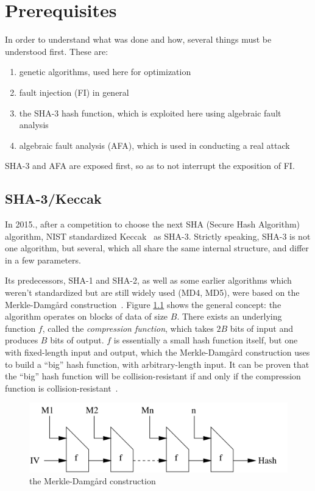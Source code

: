 \documentclass[times, utf8, diplomski]{fer}
\begin{document}
\chapter{Prerequisites}\label{ch:prerequisites}
In order to understand what was done and how, several things must be understood
first. These are:
\begin{enumerate}
    \item genetic algorithms, used here for optimization
    \item fault injection (FI) in general
    \item the SHA-3 hash function, which is exploited here using algebraic fault analysis
    \item algebraic fault analysis (AFA), which is used in conducting a real attack
\end{enumerate}

SHA-3 and AFA are exposed first, so as to not interrupt the exposition of FI.


\section{SHA-3/Keccak}\label{sec:keccak}
In 2015., after a competition to choose the next SHA (Secure Hash Algorithm)
algorithm, NIST standardized Keccak~\cite{keccak_reference} as SHA-3.
Strictly speaking, SHA-3 is not one algorithm, but several, which all share
the same internal structure, and differ in a few parameters.

Its predecessors, SHA-1 and SHA-2, as well as some earlier algorithms which
weren't standardized but are still widely used (MD4, MD5), were based on the
Merkle-Damgård construction~\cite{merkle-damgard_revisited}. Figure \ref{fig:merkle-damgard}
shows the general concept: the algorithm operates on blocks of data of size $B$.
There exists an underlying function $f$, called the \emph{compression function},
which takes $2B$ bits of input and produces $B$ bits of output. $f$ is essentially
a small hash function itself, but one with fixed-length input and output, which
the Merkle-Damgård construction uses to build a ``big'' hash function, with
arbitrary-length input. It can be proven that the ``big'' hash function will
be collision-resistant if and only if the compression function is
collision-resistant~\cite{merkle-damgard_security}.

\begin{figure}[htb]\label{fig:merkle-damgard}
    \centering
    \includegraphics{images/merkle-damgard.png}
    \caption{the Merkle-Damgård construction}
\end{figure}
\end{document}
